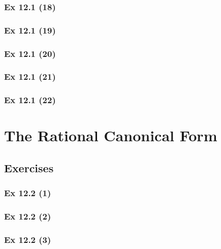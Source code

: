 \subsubsection{Ex 12.1 (18)}\label{sec:Ex_12.1.18}

\subsubsection{Ex 12.1 (19)}\label{sec:Ex_12.1.19}

\subsubsection{Ex 12.1 (20)}\label{sec:Ex_12.1.20}

\newpage		%

\subsubsection{Ex 12.1 (21)}\label{sec:Ex_12.1.21}

\subsubsection{Ex 12.1 (22)}\label{sec:Ex_12.1.22}

\newpage		%

\section{The  Rational Canonical Form}\label{sec:12.2}	
\subsection*{Exercises}\label{sec:12.2_Exercises}

\subsubsection{Ex 12.2 (1)}\label{sec:Ex_12.2.1}

\subsubsection{Ex 12.2 (2)}\label{sec:Ex_12.2.2}

\subsubsection{Ex 12.2 (3)}\label{sec:Ex_12.2.3}

